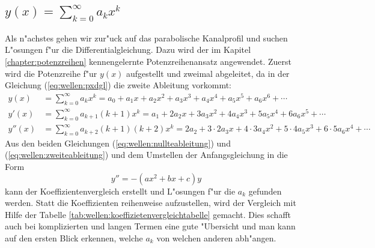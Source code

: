 \subsection{\texorpdfstring{$y(x) = \sum_{k = 0}^{\infty} a_{k}x^k$}{y(x) = 
summe k = 0 bis unendlich ak xk}}
\label{subsec:wellen:Potenzreihenansatz}

Als n"achstes gehen wir zur"uck auf das parabolische Kanalprofil und suchen 
L"osungen f"ur die Differentialgleichung. Dazu wird der im Kapitel 
\ref{chapter:potenzreihen} kennengelernte Potenzreihenansatz angewendet.
Zuerst wird die Potenzreihe f"ur $y(x)$ aufgestellt und zweimal abgeleitet, da 
in der Gleichung (\ref{eq:wellen:pxdgl}) die zweite Ableitung vorkommt:
\begin{align}
	y(x)
	&=
	\sum_{k = 0}^{\infty} a_{k}x^k
	=
	a_0 + a_1x + a_2x^2 + a_3x^3 + a_4x^4 + a_5x^5 + a_6x^6 + \dotsb
	\label{eq:wellen:nullteableitung}
	\\
	y'(x)
	&=
	\sum_{k=0}^{\infty} a_{k+1}(k+1)x^k
	=
	a_1 + 2a_2x + 3a_3x^2 + 4a_4x^3 + 5a_5x^4 + 6a_6x^5+ \dotsb
	\\
	y''(x)
	&=
	\sum_{k = 0}^{\infty} a_{k+2}(k+1)(k+2)x^k
	=
	2a_2 + 3 \mathbin{\cdot} 2a_3x + 4 \mathbin{\cdot} 3a_4x^2 + 5 
	\mathbin{\cdot} 4a_5x^3 + 6 \mathbin{\cdot} 5a_6x^4 + \dotsb
	\label{eq:wellen:zweiteableitung}
\end{align}
Aus den beiden Gleichungen (\ref{eq:wellen:nullteableitung}) und
(\ref{eq:wellen:zweiteableitung}) und dem Umstellen der Anfangsgleichung in die 
Form
\begin{equation*}
	y'' = -(ax^2+bx+c)y
\end{equation*}
kann der Koeffizientenvergleich erstellt und L"osungen f"ur die $a_k$ gefunden 
werden. Statt die Koeffizienten reihenweise aufzustellen, wird der Vergleich 
mit Hilfe der Tabelle \ref{tab:wellen:koeffizietenvergleichtabelle} gemacht. 
Dies schafft auch bei komplizierten und langen Termen eine gute "Ubersicht und 
man kann auf den ersten Blick erkennen, welche $a_k$ von welchen anderen 
abh"angen.

